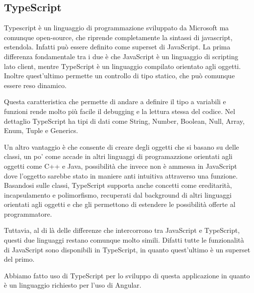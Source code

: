 \subsection{TypeScript}

Typescript è un linguaggio di programmazione sviluppato da Microsoft ma comunque open-source, che riprende completamente la sintassi di javascript, estendola. Infatti può essere definito come superset di JavaScript. La prima differenza fondamentale tra i due è che JavaScript è un linguaggio di scripting lato client, mentre TypeScript è un linguaggio compilato orientato agli oggetti. Inoltre quest'ultimo permette un controllo di tipo statico, che può comunque essere reso dinamico.

Questa caratteristica che permette di andare a definire il tipo a variabili e funzioni rende molto più facile il debugging e la lettura stessa del codice. Nel dettaglio TypeScript ha tipi di dati come String, Number, Boolean, Null, Array, Enum, Tuple e Generics. 

Un altro vantaggio è che consente di creare degli oggetti che si basano su delle classi, un po' come accade in altri linguaggi di programazzione orientati agli oggetti come C++ e Java, possibilità che invece non è ammessa in JavaScript dove l'oggetto sarebbe stato in maniere anti intuitiva attraverso una funzione. Basandosi sulle classi, TypeScript supporta anche concetti come ereditarità, incapsulamento e polimorfismo, recuperati dal background di altri linguaggi orientati agli oggetti e che gli permettono di estendere le possibilità offerte al programmatore.

Tuttavia, al di là delle differenze che intercorrono tra JavaScript e TypeScript, questi due linguaggi restano comunque molto simili. Difatti tutte le funzionalità di JavaScript sono disponibili in TypeScript, in quanto quest'ultimo è un superset del primo.

Abbiamo fatto uso di TypeScript per lo sviluppo di questa applicazione in quanto è un linguaggio richiesto per l'uso di Angular.





